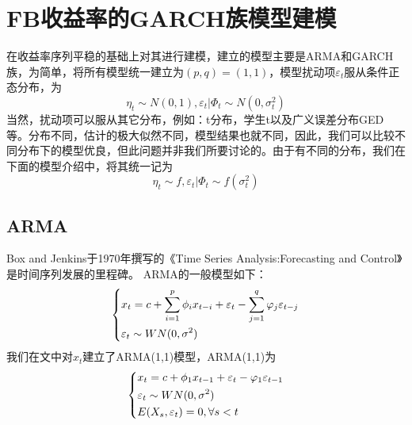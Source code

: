\section{FB收益率的GARCH族模型建模}
    \par
    在收益率序列平稳的基础上对其进行建模，建立的模型主要是ARMA和GARCH 族，为简单，将所有模型统一建立为$(p,q)=(1,1)$，模型扰动项$\varepsilon_t$服从条件正态分布，为
    \[{\eta _t} \sim N(0,1),{\varepsilon _t}|{\Phi _t} \sim N(0,\sigma _t^2)\]
    当然，扰动项可以服从其它分布，例如：t分布，学生t以及广义误差分布GED等。分布不同，估计的极大似然不同，模型结果也就不同，因此，我们可以比较不同分布下的模型优良，但此问题并非我们所要讨论的。由于有不同的分布，我们在下面的模型介绍中，将其统一记为
    \[{\eta _t} \sim f,{\varepsilon _t}|{\Phi _t} \sim f(\sigma _t^2)\]
    \subsection{ARMA}
        \par
        Box and Jenkins于1970年撰写的《Time Series Analysis:Forecasting and Control》是时间序列发展的里程碑。
        ARMA的一般模型如下：
        \begin{equation*}
        \centering
        \left\{\begin{lgathered}
        {x_t} = c + \sum\limits_{i = 1}^p {{\phi _i}{x_{t - i}}}  + {\varepsilon _t} - \sum\limits_{j = 1}^q {{\varphi _j}{\varepsilon _{t - j}}} \\
        {\varepsilon _t} \sim WN(0,{\sigma ^2})
        \end{lgathered} \right.
        \end{equation*}
        我们在文中对$x_t$建立了ARMA(1,1)模型，ARMA(1,1)为
        \begin{equation*}
        \centering
        \left\{\begin{lgathered}
        {x_t} = c + {\phi _1}{x_{t - 1}} + {\varepsilon _t} - {\varphi _1}{\varepsilon _{t - 1}}\\
        {\varepsilon _t} \sim WN(0,{\sigma ^2})\\
        E({X_s},{\varepsilon _t}) = 0,\forall s < t
        \end{lgathered} \right.
        \end{equation*}
